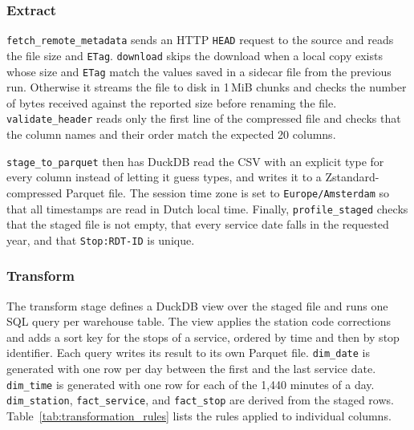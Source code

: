 \subsubsection{Extract}
\label{subsubsec:extraction}

\texttt{fetch\_remote\_metadata} sends an HTTP \texttt{HEAD} request to the source and reads the file size and \texttt{ETag}. \texttt{download} skips the download when a local copy exists whose size and \texttt{ETag} match the values saved in a sidecar file from the previous run. Otherwise it streams the file to disk in 1\,MiB chunks and checks the number of bytes received against the reported size before renaming the file. \texttt{validate\_header} reads only the first line of the compressed file and checks that the column names and their order match the expected 20 columns.

\texttt{stage\_to\_parquet} then has DuckDB read the CSV with an explicit type for every column instead of letting it guess types, and writes it to a Zstandard-compressed Parquet file. The session time zone is set to \texttt{Europe/Amsterdam} so that all timestamps are read in Dutch local time. Finally, \texttt{profile\_staged} checks that the staged file is not empty, that every service date falls in the requested year, and that \texttt{Stop:RDT-ID} is unique.

\subsubsection{Transform}
\label{subsubsec:transformation}

The transform stage defines a DuckDB view over the staged file and runs one SQL query per warehouse table. The view applies the station code corrections and adds a sort key for the stops of a service, ordered by time and then by stop identifier. Each query writes its result to its own Parquet file. \texttt{dim\_date} is generated with one row per day between the first and the last service date. \texttt{dim\_time} is generated with one row for each of the 1,440 minutes of a day. \texttt{dim\_station}, \texttt{fact\_service}, and \texttt{fact\_stop} are derived from the staged rows. Table~\ref{tab:transformation_rules} lists the rules applied to individual columns.

